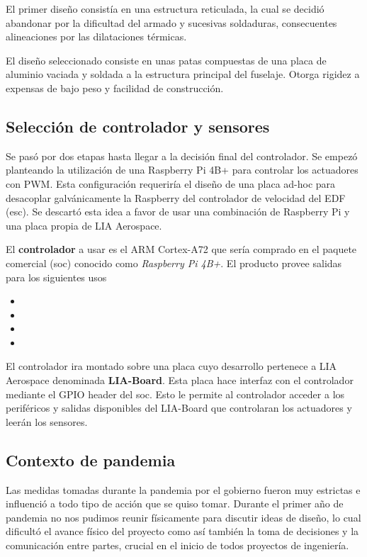 El primer diseño consistía en una estructura reticulada, la cual se decidió abandonar por la dificultad del armado y sucesivas soldaduras, consecuentes alineaciones por las dilataciones térmicas.

\medskip

El diseño seleccionado consiste en unas patas compuestas de una placa de aluminio vaciada y soldada a la estructura principal del fuselaje. Otorga rigidez a expensas de bajo peso y facilidad de construcción.


\subsection{Selección de controlador y sensores}

Se pasó por dos etapas hasta llegar a la decisión final del controlador. Se empezó planteando la utilización de una Raspberry Pi 4B+ para controlar los actuadores con PWM. Esta configuración requeriría el diseño de una placa ad-hoc para desacoplar galvánicamente la Raspberry del controlador de velocidad del EDF (\gls{esc}). Se descartó esta idea a favor de usar una combinación de Raspberry Pi y una placa propia de LIA Aerospace.

\medskip

El \textbf{controlador} a usar es el ARM Cortex-A72 que sería comprado en el paquete comercial (\gls{soc}) conocido como \textit{Raspberry Pi 4B+}. El producto provee salidas para los siguientes usos

\begin{itemize}
    \item {}
    \item {}
    \item {}
    \item {}
\end{itemize}

El controlador ira montado sobre una placa cuyo desarrollo pertenece a LIA Aerospace denominada \textbf{LIA-Board}. Esta placa hace interfaz con el controlador mediante el GPIO header del \gls{soc}. Esto le permite al controlador acceder a los periféricos y salidas disponibles del LIA-Board que controlaran los actuadores y leerán los sensores.


\subsection{Contexto de pandemia}
Las medidas tomadas durante la pandemia por el gobierno fueron muy estrictas e influenció a todo tipo de acción que se quiso tomar. Durante el primer año de pandemia no nos pudimos reunir físicamente para discutir ideas de diseño, lo cual dificultó el avance físico del proyecto como así también la toma de decisiones y la comunicación entre partes, crucial en el inicio de todos proyectos de ingeniería.

